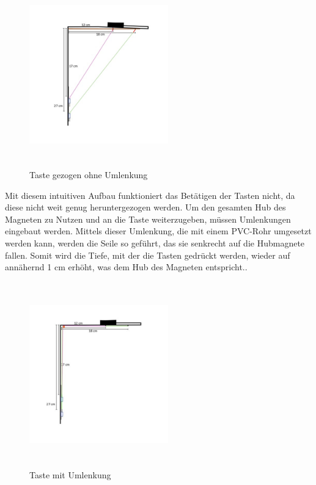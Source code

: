 \begin{figure}[htbp]
    \centering
    \includegraphics[width=6cm, height=8cm]{img/Umlenkung_gezogen}
    \caption{Taste gezogen ohne Umlenkung}
    \label{img:kUmlenkung_gezogen}
\end{figure}

Mit diesem intuitiven Aufbau funktioniert das Betätigen der Tasten nicht, da diese nicht weit genug heruntergezogen werden.
Um den gesamten Hub des Magneten zu Nutzen und an die Taste weiterzugeben, müssen Umlenkungen eingebaut werden.
Mittels dieser Umlenkung, die mit einem PVC-Rohr umgesetzt werden kann, werden die Seile so geführt, das sie senkrecht auf die Hubmagnete fallen.
Somit wird die Tiefe, mit der die Tasten gedrückt werden, wieder auf annähernd 1 cm erhöht, was dem Hub des Magneten entspricht..

\begin{figure}[htbp]
    \centering
    \includegraphics[width=6cm, height=8cm]{img/mitUmlenkung_locker}
    \caption{Taste mit Umlenkung}
    \label{img:mitumlenkung_locker}
\end{figure}


